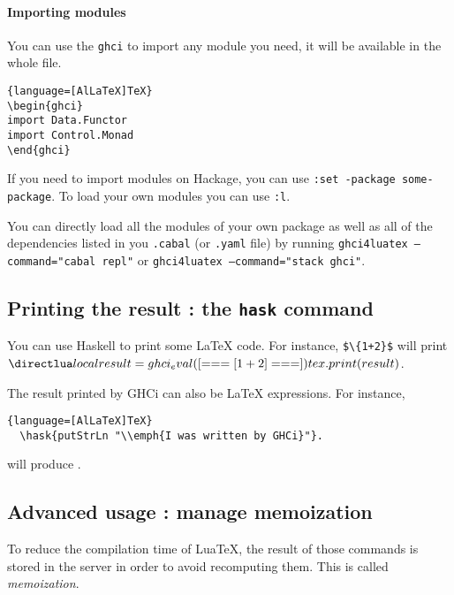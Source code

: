 \documentclass{article}
\begin{document}
\paragraph{Importing modules}
You can use the \texttt{ghci} to import any module you need, it will be available in the whole file.

\begin{lstlisting}{language=[AlLaTeX]TeX}
\begin{ghci}
import Data.Functor
import Control.Monad
\end{ghci}
\end{lstlisting}

If you need to import modules on Hackage, you can use \texttt{:set -package some-package}. To load your own modules you can use \texttt{:l}.

\begin{tipbox}
  You can directly load all the modules of your own package as well as all of the dependencies listed in you \texttt{.cabal} (or \texttt{.yaml} file) by running \texttt{ghci4luatex --command="cabal repl"} or \texttt{ghci4luatex --command="stack ghci"}.
\end{tipbox}

\subsection{Printing the result : the \texttt{hask} command}

You can use Haskell to print some LaTeX code. For instance, \texttt{\$\textbackslash {}\{1+2\}\$} will print $\hask{1 + 2}$.


The result printed by GHCi can also be  LaTeX expressions. For instance,

\begin{lstlisting}{language=[AlLaTeX]TeX}
  \hask{putStrLn "\\emph{I was written by GHCi}"}.
\end{lstlisting}
\noindent
will produce .



\subsection{Advanced usage : manage memoization}

To reduce the compilation time of LuaTeX, the result of those commands is stored in the server in order to avoid recomputing them. This is called \emph{memoization}.
\end{document}
